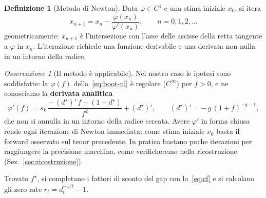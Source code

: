 \documentclass[11pt,a4paper]{article}
\theoremstyle{plain}
\theoremstyle{definition}
\newtheorem{definizione}[teorema]{Definizione}
\theoremstyle{remark}
\newtheorem*{osservazione}{Osservazione}
\newcommand{\FSP}{\mathrm{FSP}}
\begin{document}
\begin{definizione}[Metodo di Newton]
Data $\varphi\in C^1$ e una stima iniziale $x_0$, si itera
\begin{equation}
  \label{eq:newton}
  x_{n+1} = x_n - \frac{\varphi(x_n)}{\varphi'(x_n)}, \qquad n=0,1,2,\ldots
\end{equation}
geometricamente: $x_{n+1}$ \`e l'intersezione con l'asse delle ascisse della retta tangente a
$\varphi$ in $x_n$. L'iterazione richiede una funzione derivabile e una derivata non nulla in un
intorno della radice.
\end{definizione}

\begin{osservazione}[Il metodo \`e applicabile]
Nel nostro caso le ipotesi sono soddisfatte: la $\varphi(f)$ della~\eqref{eq:boot-nl} \`e regolare
($C^\infty$) per $f>0$, e ne conosciamo la \textbf{derivata analitica}
\begin{equation}
  \label{eq:boot-nl-der}
  \varphi'(f) = s_{k}\,\frac{-\,(d^\star)'\,f - (1 - d^\star)}{f^2} + (d^\star)',
  \qquad (d^\star)' = -\,g\,(1+f)^{-g-1},
\end{equation}
che non si annulla in un intorno della radice cercata. Avere $\varphi'$ in forma chiusa rende ogni
iterazione di Newton immediata; come stima iniziale $x_0$ basta il forward osservato sul tenor
precedente. In pratica bastano poche iterazioni per raggiungere la precisione macchina, come
verificheremo nella ricostruzione (Sez.~\ref{sec:ricostruzione}).
\end{osservazione}

Trovato $f^\star$, si completano i fattori di sconto del gap con la~\eqref{eq:cf} e si calcolano
gli zero rate $r_t=d_t^{-1/t}-1$.

\end{document}
